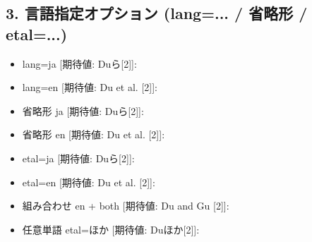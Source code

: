 \subsection*{3. 言語指定オプション (lang=... / 省略形 / etal=...)}
\begin{itemize}
  \item lang=ja [期待値: Duら[2]]: 
  \item lang=en [期待値: Du et al. [2]]: 
  \item 省略形 ja [期待値: Duら[2]]: 
  \item 省略形 en [期待値: Du et al. [2]]: 
  \item etal=ja [期待値: Duら[2]]: 
  \item etal=en [期待値: Du et al. [2]]: 
  \item 組み合わせ en + both [期待値: Du and Gu [2]]: 
  \item 任意単語 etal={ほか} [期待値: Duほか[2]]: 
\end{itemize}





